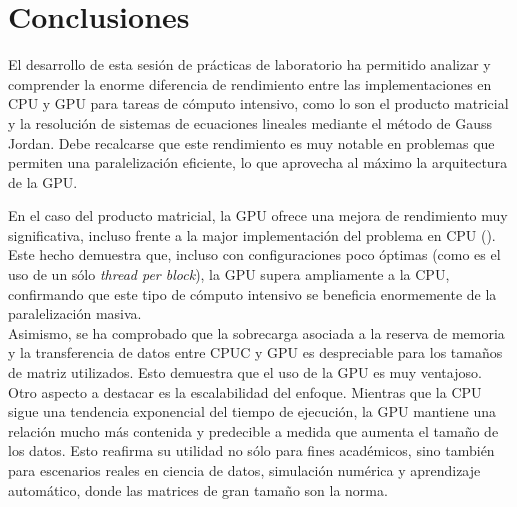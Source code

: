\pagestyle{fancy}
\fancyhead[LO]{\autorR}
\fancyhead[LE]{\autorA}
\fancyhead[RE,RO]{\textit{\rightmark}}
\fancyfoot[L]{\asignaturaAbbr}
\fancyfoot[R]{\fecha}

\section{Conclusiones} \label{sec:5}
El desarrollo de esta sesión de prácticas de laboratorio ha permitido analizar y comprender la enorme diferencia de rendimiento 
entre las implementaciones en CPU y GPU para tareas de cómputo intensivo, como lo son el producto matricial y la resolución 
de sistemas de ecuaciones lineales mediante el método de Gauss Jordan. Debe recalcarse que este rendimiento es muy notable 
en problemas que permiten una paralelización eficiente, lo que aprovecha al máximo la arquitectura de la GPU.

En el caso del producto matricial, la GPU ofrece una mejora de rendimiento muy significativa, incluso frente a la major implementación 
del problema en CPU (\zorder). Este hecho demuestra que, incluso con configuraciones poco óptimas (como es el uso de un sólo 
\textit{thread per block}), la GPU supera ampliamente a la CPU, confirmando que este tipo de cómputo intensivo se beneficia 
enormemente de la paralelización masiva. \\
Asimismo, se ha comprobado que la sobrecarga asociada a la reserva de memoria y la transferencia de datos entre CPUC y GPU es 
despreciable para los tamaños de matriz utilizados. Esto demuestra que el uso de la GPU es muy ventajoso.
Otro aspecto a destacar es la escalabilidad del enfoque. Mientras que la CPU sigue una tendencia exponencial del tiempo de 
ejecución, la GPU mantiene una relación mucho más contenida y predecible a medida que aumenta el tamaño de los datos. Esto 
reafirma su utilidad no sólo para fines académicos, sino también para escenarios reales en ciencia de datos, simulación numérica
y aprendizaje automático, donde las matrices de gran tamaño son la norma.

